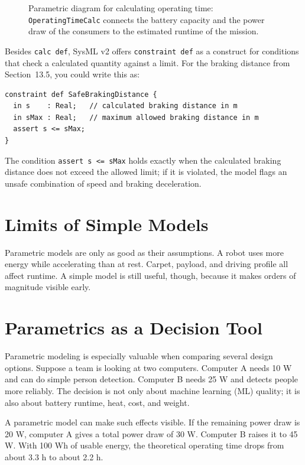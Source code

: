 \begin{figure}[H]
  \centering
  \caption{Parametric diagram for calculating operating time: \texttt{OperatingTimeCalc} connects the battery capacity and the power draw of the consumers to the estimated runtime of the mission.}
  \label{fig:kap13-parametrisch-betriebszeit}
\end{figure}

Besides \texttt{calc def}, SysML v2 offers \texttt{constraint def} as a construct for conditions that check a calculated quantity against a limit. For the braking distance from Section~13.5, you could write this as:

\begin{lstlisting}
constraint def SafeBrakingDistance {
  in s    : Real;   // calculated braking distance in m
  in sMax : Real;   // maximum allowed braking distance in m
  assert s <= sMax;
}
\end{lstlisting}

The condition \texttt{assert s <= sMax} holds exactly when the calculated braking distance does not exceed the allowed limit; if it is violated, the model flags an unsafe combination of speed and braking deceleration.

\section{Limits of Simple Models}
Parametric models are only as good as their assumptions. A robot uses more energy while accelerating than at rest. Carpet, payload, and driving profile all affect runtime. A simple model is still useful, though, because it makes orders of magnitude visible early.

\section{Parametrics as a Decision Tool}
Parametric modeling is especially valuable when comparing several design options. Suppose a team is looking at two computers. Computer A needs 10 W and can do simple person detection. Computer B needs 25 W and detects people more reliably. The decision is not only about machine learning (ML) quality; it is also about battery runtime, heat, cost, and weight.

A parametric model can make such effects visible. If the remaining power draw is 20 W, computer A gives a total power draw of 30 W. Computer B raises it to 45 W. With 100 Wh of usable energy, the theoretical operating time drops from about 3.3 h to about 2.2 h.

